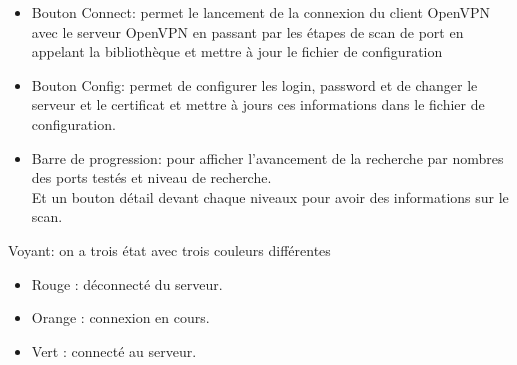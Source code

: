 \documentclass[12pt,a4paper]{article}
\begin{document}
\begin{itemize}
\item Bouton Connect: permet le lancement de la connexion du client OpenVPN avec le serveur OpenVPN en passant par les étapes de scan de port en appelant la bibliothèque et mettre à jour le fichier de configuration\\
\item Bouton Config: permet de configurer les login, password et de changer le serveur et le certificat et mettre à jours ces informations dans le fichier de configuration.\\

\item Barre de progression: pour afficher l’avancement de la  recherche  par nombres des ports testés et niveau de recherche.\\

Et un bouton détail devant chaque niveaux pour avoir des informations sur le scan.
\end{itemize}

Voyant: on a trois état avec trois couleurs différentes
\begin{itemize}
\item Rouge  : déconnecté du serveur.
\vspace{8pt}
\item Orange : connexion en cours.
\vspace{8pt}
\item Vert   : connecté au serveur.\\
\end{itemize}
\end{document}
